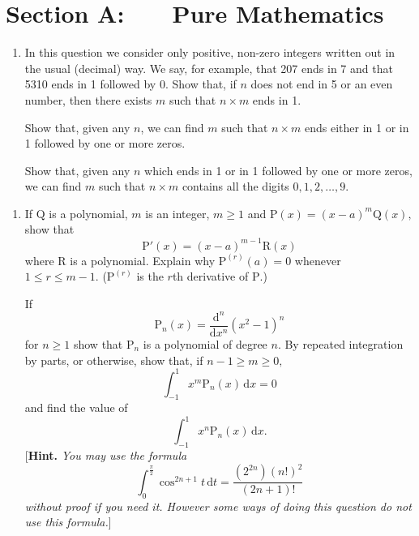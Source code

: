 \documentclass[a4, 11pt]{report}
\newlength{\qspace}
\newcounter{qnumber}
\newenvironment{question}%
 {\vspace{\qspace}
  \begin{enumerate}[\bfseries 1\quad][10]%
    \setcounter{enumi}{\value{qnumber}}%
    \item%
 }
{
  \end{enumerate}
  \filbreak
  \stepcounter{qnumber}
 }
\begin{document}
\setcounter{page}{2}

 
\section*{Section A: \ \ \ Pure Mathematics}

\begin{question}
In this question we consider only positive, non-zero integers written
out in the usual (decimal) way. We say, for example, that 207 ends
in 7 and that 5310 ends in 1 followed by 0. Show that, if $n$ does
not end in 5 or an even number, then there exists $m$ such that $n\times m$
ends in 1. 


Show that, given any $n$, we can find $m$ such that $n\times m$
ends either in 1 or in 1 followed by one or more zeros. 


Show that, given any $n$ which ends in 1 or in 1 followed by one
or more zeros, we can find $m$ such that $n\times m$ contains all
the digits $0,1,2,\ldots,9$. 
\end{question}

\begin{question}
If $\mathrm{Q}$ is a polynomial, $m$ is an integer, $m\geqslant1$
and $\mathrm{P}(x)=(x-a)^{m}\mathrm{Q}(x),$ show that \[
\mathrm{P}'(x)=(x-a)^{m-1}\mathrm{R}(x)
\]
where $\mathrm{R}$ is a polynomial. Explain why $\mathrm{P}^{(r)}(a)=0$
whenever $1\leqslant r\leqslant m-1$. ($\mathrm{P}^{(r)}$ is the
$r$th derivative of $\mathrm{P}.$)


If 
\[
\mathrm{P}_{n}(x)=\frac{\mathrm{d}^{n}}{\mathrm{d}x^{n}}(x^{2}-1)^{n}
\]
for $n\geqslant1$ show that $\mathrm{P}_{n}$ is a polynomial of
degree $n$. By repeated integration by parts, or otherwise, show
that, if $n-1\geqslant m\geqslant0,$ 
\[
\int_{-1}^{1}x^{m}\mathrm{P}_{n}(x)\,\mathrm{d}x=0
\]
and find the value of 
\[
\int_{-1}^{1}x^{n}\mathrm{P}_{n}(x)\,\mathrm{d}x.
\]
{[}\textbf{Hint. }\textit{You may use the formula 
\[
{\displaystyle \int_{0}^{\frac{\pi}{2}}\cos^{2n+1}t\,\mathrm{d}t=\frac{(2^{2n})(n!)^{2}}{(2n+1)!}}
\]
 without proof if you need it. However some ways of doing this question
do not use this formula.}{]}
\end{question}
\end{document}
